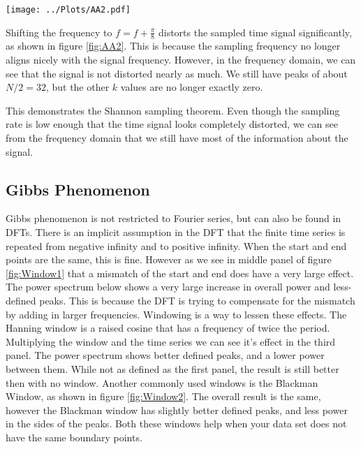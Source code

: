 \documentclass[twocolumn]{myarticle}
\begin{document}
\begin{figure*}[htb]
    \centering
    \texttt{[image: ../Plots/AA2.pdf]}
    \caption{%
        DFT of the modified cosine of $x[n]=\cos(2\pi (f+\pi/8) n\Delta t)$. Top figure showing the sampled time series, the middle showing the DFT, and the bottom displaying the power in dB.
    }
    \label{fig:AA2}
\end{figure*}
Shifting the frequency to $f=f+\frac{\pi}{8}$ distorts the sampled time signal significantly, as shown in figure \ref{fig:AA2}. 
This is because the sampling frequency no longer aligns nicely with the signal frequency.
However, in the frequency domain, we can see that the signal is not distorted nearly as much.
We still have peaks of about $ N/2 = 32 $, but the other $ k $ values are no longer exactly zero.

This demonstrates the Shannon sampling theorem.
Even though the sampling rate is low enough that the time signal looks completely distorted, we can see from the frequency domain that we still have most of the information about the signal.


\subsection{Gibbs Phenomenon}
\label{sec:gibbs_phenomenon}

Gibbs phenomenon is not restricted to Fourier series, but can also be found in DFTs. 
There is an implicit assumption in the DFT that the finite time series is repeated from negative infinity and to positive infinity. 
When the start and end points are the same, this is fine. 
However as we see in middle panel of figure \ref{fig:Window1} that a mismatch of the start and end does have a very large effect. 
The power spectrum below shows a very large increase in overall power and less-defined peaks. 
This is because the DFT is trying to compensate for the mismatch by adding in larger frequencies. 
Windowing is a way to lessen these effects. 
The Hanning window is a raised cosine that has a frequency of twice the period. 
Multiplying the window and the time series we can see it's effect in the third panel. 
The power spectrum shows better defined peaks, and a lower power between them. 
While not as defined as the first panel, the result is still better then with no window. 
Another commonly used windows is the Blackman Window, as shown in figure \ref{fig:Window2}. 
The overall result is the same, however the Blackman window has slightly better defined peaks, and less power in the sides of the peaks. 
Both these windows help when your data set does not have the same boundary points.
\end{document}
